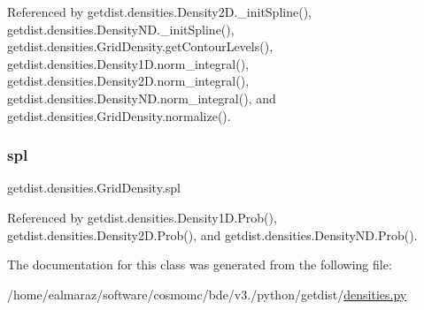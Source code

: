 Referenced by getdist.\+densities.\+Density2\+D.\+\_\+init\+Spline(), getdist.\+densities.\+Density\+N\+D.\+\_\+init\+Spline(), getdist.\+densities.\+Grid\+Density.\+get\+Contour\+Levels(), getdist.\+densities.\+Density1\+D.\+norm\+\_\+integral(), getdist.\+densities.\+Density2\+D.\+norm\+\_\+integral(), getdist.\+densities.\+Density\+N\+D.\+norm\+\_\+integral(), and getdist.\+densities.\+Grid\+Density.\+normalize().

\mbox{\label{classgetdist_1_1densities_1_1GridDensity_a82560f102e430ebcd25f8ab8bf140a69}} 
\subsubsection{\texorpdfstring{spl}{spl}}
{\footnotesize\ttfamily getdist.\+densities.\+Grid\+Density.\+spl}



Referenced by getdist.\+densities.\+Density1\+D.\+Prob(), getdist.\+densities.\+Density2\+D.\+Prob(), and getdist.\+densities.\+Density\+N\+D.\+Prob().



The documentation for this class was generated from the following file\+:\begin{DoxyCompactItemize}
\item 
/home/ealmaraz/software/cosmomc/bde/v3./python/getdist/\mbox{\hyperlink{densities_8py}{densities.\+py}}\end{DoxyCompactItemize}
